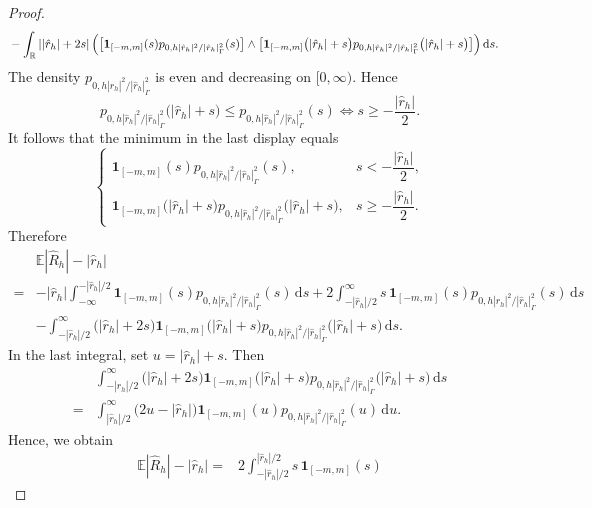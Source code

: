 \documentclass[aap]{imsart}
\theoremstyle{plain}
\theoremstyle{definition}
\begin{document}
\begin{proof}
\[\begin{aligned}
		&-
		\int_{\mathbb R}
		\left|
		|\hat r_h|+2s
		\right|\Bigl(
		\bigl[
		\mathbf 1_{[-m,m]}(s)
		p_{0,h|\hat r_h|^2/|\hat r_h|_\Gamma^2}(s)
		\bigr]\wedge
		\bigl[
		\mathbf 1_{[-m,m]}
		\bigl(|\hat r_h|+s\bigr)
		p_{0,h|\hat r_h|^2/|\hat r_h|_\Gamma^2}
		\bigl(|\hat r_h|+s\bigr)
		\bigr]
		\Bigr)
		\,\mathrm ds .
	\end{aligned}
	\]	
	The density \(p_{0,h|\hat r_h|^2/|\hat r_h|_\Gamma^2}\)
	is even and decreasing on \([0,\infty)\). Hence
	\[p_{0,h|\hat r_h|^2/|\hat r_h|_\Gamma^2}
		\bigl(|\hat r_h|+s\bigr)
		\leqslant
		p_{0,h|\hat r_h|^2/|\hat r_h|_\Gamma^2}(s)\Longleftrightarrow
		s\geqslant -\frac{|\hat r_h|}{2}.\]
	It follows that the minimum in the last display equals
	\[
	\begin{cases}
		\mathbf 1_{[-m,m]}(s)
		p_{0,h|\hat r_h|^2/|\hat r_h|_\Gamma^2}(s),
		&
		s<-\dfrac{|\hat r_h|}{2},\\[2mm]
		\mathbf 1_{[-m,m]}\bigl(|\hat r_h|+s\bigr)
		p_{0,h|\hat r_h|^2/|\hat r_h|_\Gamma^2}
		\bigl(|\hat r_h|+s\bigr),
		&
		s\geqslant -\dfrac{|\hat r_h|}{2}.
	\end{cases}
	\]
	Therefore
	\[
	\begin{aligned}
		&\mathbb E|\hat{R}_h|
		-|\hat r_h| \\
		=&
		-
		|\hat r_h|
		\int_{-\infty}^{-|\hat r_h|/2}
		\mathbf 1_{[-m,m]}(s)
		p_{0,h|\hat r_h|^2/|\hat r_h|_\Gamma^2}(s)
		\,\mathrm ds+
		2
		\int_{-|\hat r_h|/2}^{\infty}
		s\,\mathbf 1_{[-m,m]}(s)
		p_{0,h|\hat r_h|^2/|\hat r_h|_\Gamma^2}(s)
		\,\mathrm ds\\
		&-
		\int_{-|\hat r_h|/2}^{\infty}
		\bigl(|\hat r_h|+2s\bigr)
		\mathbf 1_{[-m,m]}
		\bigl(|\hat r_h|+s\bigr)
		p_{0,h|\hat r_h|^2/|\hat r_h|_\Gamma^2}
		\bigl(|\hat r_h|+s\bigr)
		\,\mathrm ds .
	\end{aligned}
	\]
	In the last integral, set \(u=|\hat r_h|+s\).
	Then
	\[
	\begin{aligned}
		&\int_{-|\hat r_h|/2}^{\infty}
		\bigl(|\hat r_h|+2s\bigr)
		\mathbf 1_{[-m,m]}
		\bigl(|\hat r_h|+s\bigr)
		p_{0,h|\hat r_h|^2/|\hat r_h|_\Gamma^2}
		\bigl(|\hat r_h|+s\bigr)
		\,\mathrm ds \\
		=&
		\int_{|\hat r_h|/2}^{\infty}
		\bigl(2u-|\hat r_h|\bigr)
		\mathbf 1_{[-m,m]}(u)
		p_{0,h|\hat r_h|^2/|\hat r_h|_\Gamma^2}(u)
		\,\mathrm du .
	\end{aligned}
	\]
	Hence, we obtain
	\[
	\begin{aligned}
		\mathbb E|\hat{R}_h|
		-|\hat r_h| =&
		2
		\int_{-|\hat r_h|/2}^{|\hat r_h|/2}
		s\,\mathbf 1_{[-m,m]}(s)

\end{aligned}\]
\end{proof}
\end{document}
